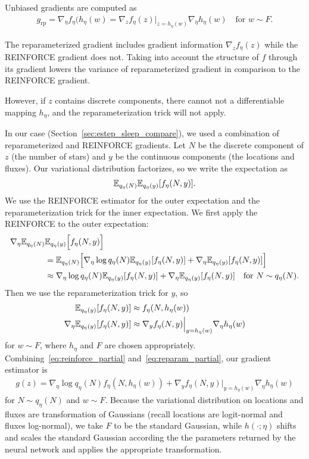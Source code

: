 Unbiased gradients are computed as 
\begin{align}
    g_{\textrm{rp}} 
    = \nabla_\eta f_\eta(h_\eta(w)
    = \nabla_z f_\eta(z)\Big|_{z = h_\eta(w)}
    \nabla_\eta h_\eta(w) \quad \text{for } w\sim F. 
\end{align}

The reparameterized gradient includes gradient information $\nabla_z f_\eta(z)$ while the REINFORCE gradient does not. Taking into account the structure of $f$ through its gradient lowers the variance of reparameterized gradient in comparison to the REINFORCE gradient. 

However, if $z$ contains discrete components, there cannot not a differentiable mapping $h_\eta$, and the reparameterization trick will not apply. 

In our case (Section~\ref{sec:estep_sleep_compare}), we used a combination of reparameterized and REINFORCE gradients. Let $N$ be the discrete component of $z$ (the number of stars) and $y$ be the continuous components (the locations and fluxes). Our variational distribution factorizes, so we write the expectation as 
\begin{align}
 \mathbb{E}_{q_\eta(N)}\mathbb{E}_{q_\eta(y)}[f_\eta(N, y)]. 
\end{align}
We use the REINFORCE estimator for the outer expectation and the reparameterization trick for the inner expectation. We first apply the REINFORCE to the outer expectation: 
\begin{align}
    \nabla_\eta  \mathbb{E}_{q_\eta(N)}&\mathbb{E}_{q_\eta(y)}\Big[f_\eta(N, y)\Big] \\
    &=  \mathbb{E}_{q_\eta(N)}\Big[ \nabla_\eta \log q_\eta(N) \mathbb{E}_{q_\eta(y)}[f_\eta(N, y)] + 
    \nabla_\eta \mathbb{E}_{q_\eta(y)}[f_\eta(N, y)] \Big]\\
    &\approx \nabla_\eta \log q_\eta(N) \mathbb{E}_{q_\eta(y)}[f_\eta(N, y)] + 
    \nabla_\eta \mathbb{E}_{q_\eta(y)}[f_\eta(N, y)] \quad \text{for } N \sim q_\eta(N). 
    \label{eq:reinforce_partial}
\end{align}
Then we use the reparameterization trick for $y$, so 
\begin{align}
    \mathbb{E}_{q_\eta(y)}[f_\eta(N, y)] &\approx f_\eta(N, h_\eta(w))\\
    \nabla_\eta \mathbb{E}_{q_\eta(y)}[f_\eta(N, y)] &\approx  \nabla_y f_\eta(N, y)\Big|_{y = h_\eta(w)}
    \nabla_\eta h_\eta(w) 
    \label{eq:reparam_partial}
\end{align}
for $w \sim F$, where $h_\eta$ and $F$ are chosen appropriately. Combining~\eqref{eq:reinforce_partial} and~\eqref{eq:reparam_partial}, our gradient estimator is 
\begin{align}
    g(z) = \nabla_\eta \log q_\eta(N) 
    f_\eta(N, h_\eta(w)) + 
    \nabla_y f_\eta(N, y)\Big|_{y = h_\eta(w)}
    \nabla_\eta h_\eta(w) 
\end{align}
for $N\sim q_\eta(N)$ and $w\sim F$. Because the variational distribution on locations and fluxes are transformation of Gaussians (recall locations are logit-normal and fluxes log-normal), we take $F$ to be the standard Gaussian, while $h(\cdot ; \eta)$ shifts and scales the standard Gaussian according the the parameters returned by the neural network and applies the appropriate transformation. 

